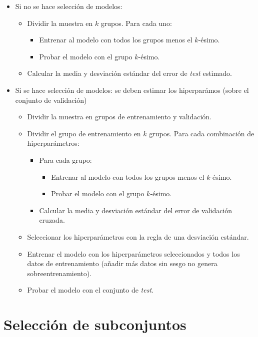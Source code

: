 \begin{itemize}
\item Si no se hace selección de modelos:
\begin{itemize}
\item Dividir la muestra en $k$ grupos. Para cada uno:
\begin{itemize}
\item Entrenar al modelo con todos los grupos menos el $k$-ésimo.
\item Probar el modelo con el grupo $k$-ésimo.
\end{itemize}
\item Calcular la media y desviación estándar del error de \textit{test} estimado.
\end{itemize}
\item Si se hace selección de modelos: se deben estimar los hiperparámos (sobre el conjunto de validación)
\begin{itemize}
\item Dividir la muestra en grupos de entrenamiento y validación.
\item Dividir el grupo de entrenamiento en $k$ grupos. Para cada combinación de hiperparámetros:
\begin{itemize}
\item Para cada grupo:
\begin{itemize}
\item Entrenar al modelo con todos los grupos menos el $k$-ésimo.
\item Probar el modelo con el grupo $k$-ésimo.
\end{itemize}
\item Calcular la media y desviación estándar del error de validación cruzada.
\end{itemize}
\item Seleccionar los hiperparámetros con la regla de una desviación estándar.
\item Entrenar el modelo con los hiperparámetros seleccionados y todos los datos de entrenamiento (añadir más datos sin sesgo no genera sobreentrenamiento).
\item Probar el modelo con el conjunto de \textit{test}.
\end{itemize}
\end{itemize}







\section{Selección de subconjuntos} \label{sec:4.1}

